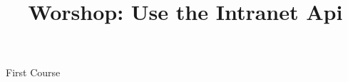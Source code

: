 \documentclass{pdfArticle}
\title{Worshop: Use the Intranet Api}
\begin{document}
    First Course
\end{document}

